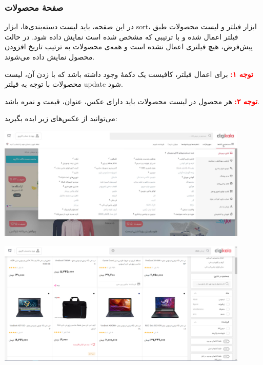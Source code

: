 \documentclass[]{article}
\begin{document}
\subsubsection*{{\titr صفحهٔ محصولات}}


در این صفحه، باید لیست دسته‌بندی‌ها، ابزار sort، ابزار فیلتر و لیست محصولات طبق فیلتر اعمال شده و با ترتیبی که مشخص شده است نمایش داده شود. در حالت پیش‌فرض، هیچ فیلتری اعمال نشده است و همه‌ی محصولات به ترتیب تاریخ افزودن محصول نمایش داده می‌شوند.


\textbf{\textcolor{red}{توجه ۱:}}
برای اعمال فیلتر، کافیست یک دکمهٔ وجود داشته باشد که با زدن آن، لیست محصولات با توجه به فیلتر update شود.


\textbf{\textcolor{red}{توجه ۲:}}
 هر محصول در لیست محصولات باید دارای عکس، عنوان، قیمت و نمره باشد.


می‌توانید از عکس‌های زیر ایده بگیرید:


\begin{center}
\includegraphics[width=0.9\textwidth]{images/image16.png}
\end{center}


\begin{center}
\includegraphics[width=0.9\textwidth]{images/image19.png}
\end{center}
\end{document}
